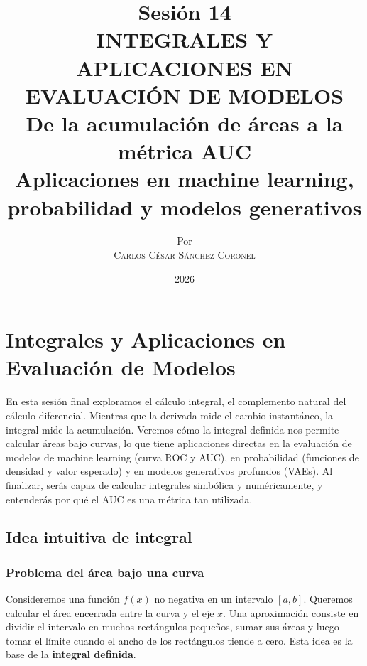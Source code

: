\documentclass[12pt,a4paper,openany,oneside]{book}
\title{
    \textbf{Sesión 14} \\ 
    \Huge \textbf{INTEGRALES Y APLICACIONES EN EVALUACIÓN DE MODELOS} \\
    \large De la acumulación de áreas a la métrica AUC \\
    \normalsize Aplicaciones en machine learning, probabilidad y modelos generativos
}
\author{
    \small Por \\ \vspace{0.2cm}
    \Large \textsc{Carlos César Sánchez Coronel}
}
\date{2026}
\begin{document}
\maketitle
\tableofcontents
{}

\chapter{Integrales y Aplicaciones en Evaluación de Modelos}

En esta sesión final exploramos el cálculo integral, el complemento natural del cálculo diferencial. Mientras que la derivada mide el cambio instantáneo, la integral mide la acumulación. Veremos cómo la integral definida nos permite calcular áreas bajo curvas, lo que tiene aplicaciones directas en la evaluación de modelos de machine learning (curva ROC y AUC), en probabilidad (funciones de densidad y valor esperado) y en modelos generativos profundos (VAEs). Al finalizar, serás capaz de calcular integrales simbólica y numéricamente, y entenderás por qué el AUC es una métrica tan utilizada.

\section{Idea intuitiva de integral}

\subsection{Problema del área bajo una curva}
Consideremos una función $f(x)$ no negativa en un intervalo $[a,b]$. Queremos calcular el área encerrada entre la curva y el eje $x$. Una aproximación consiste en dividir el intervalo en muchos rectángulos pequeños, sumar sus áreas y luego tomar el límite cuando el ancho de los rectángulos tiende a cero. Esta idea es la base de la \textbf{integral definida}.

\begin{center}
\end{center}
\end{document}
